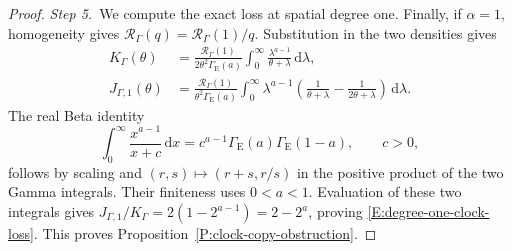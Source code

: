 \documentclass[12pt,oneside,openany]{book}
\numberwithin{equation}{section}
\theoremstyle{nogostyle}
\theoremstyle{definition}
\newcommand{\ud}{\,\mathrm{d}}
\begin{document}
\begin{proof}
  \medskip
  \noindent\textit{Step 5.~}We compute the exact loss at spatial degree one.
  Finally, if \(\alpha=1\), homogeneity gives
  \(\mathcal{R}_\Gamma(q)=\mathcal{R}_\Gamma(1)/q\). Substitution in the two
  densities gives
  \[
    \begin{split}
      K_\Gamma(\theta)
      &=\frac{\mathcal{R}_\Gamma(1)}
      {2\theta^2\Gamma_{\mathrm{E}}(a)}
      \int_0^\infty\frac{\lambda^{a-1}}{\theta+\lambda}\ud\lambda,\\
      J_{\Gamma,1}(\theta)
      &=\frac{\mathcal{R}_\Gamma(1)}
      {\theta^2\Gamma_{\mathrm{E}}(a)}
      \int_0^\infty\lambda^{a-1}
      \left(\frac1{\theta+\lambda}
      -\frac1{2\theta+\lambda}\right)\ud\lambda .
    \end{split}
  \]
  The real Beta identity
  \[
    \int_0^\infty\frac{x^{a-1}}{x+c}\ud x
    =c^{a-1}\Gamma_{\mathrm{E}}(a)\Gamma_{\mathrm{E}}(1-a),
    \qquad c>0,
  \]
  follows by scaling and \((r,s)\mapsto(r+s,r/s)\) in the positive product of
  the two Gamma integrals. Their finiteness uses \(0<a<1\). Evaluation of these
  two integrals gives \(J_{\Gamma,1}/K_\Gamma=2(1-2^{a-1})=2-2^a\), proving
  \eqref{E:degree-one-clock-loss}. This proves
  Proposition~\ref{P:clock-copy-obstruction}.
\end{proof}
\end{document}
